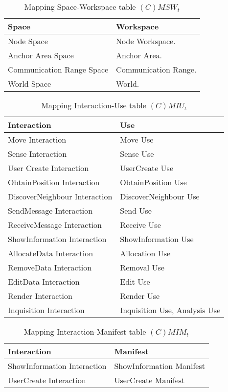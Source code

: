 \begin{table}[H]
	\centering
	\begin{tabular}{|p{4cm}|p{8cm}|}
			\hline
			\textbf{Space} & \textbf{Workspace} \\
			\hline
			Node Space & Node Workspace. \\
			\hline
			Anchor Area Space & Anchor Area. \\
			\hline
			Communication Range Space & Communication Range.\\
			\hline
			World Space & World. \\
			\hline
		\end{tabular}
	\caption{Mapping Space-Workspace table $(C)MSW_t$}
	\label{tab:cmsrt}
\end{table}

\begin{table}[H]
	\centering
	\begin{tabular}{|p{4cm}|p{8cm}|}
			\hline
			\textbf{Interaction} & \textbf{Use} \\
			\hline
			Move Interaction & Move Use \\
			\hline
			Sense Interaction & Sense Use \\
			\hline
			User Create Interaction & UserCreate Use \\
			\hline
			ObtainPosition Interaction & ObtainPosition Use \\	
			\hline
			DiscoverNeighbour Interaction & DiscoverNeighbour Use \\	
			\hline
			SendMessage Interaction & Send Use \\	
			\hline
			ReceiveMessage Interaction & Receive Use \\	
			\hline
			ShowInformation Interaction & ShowInformation Use \\
			\hline
			AllocateData Interaction & Allocation Use \\
			\hline
			RemoveData Interaction & Removal Use \\
			\hline
			EditData Interaction & Edit Use \\
			\hline
			Render Interaction & Render Use \\
			\hline
			Inquisition Interaction & Inquisition Use, Analysis Use \\
			\hline
		\end{tabular}
	\caption{Mapping Interaction-Use table $(C)MIU_t$}
	\label{tab:cmiut}
\end{table}

\begin{table}[H]
	\centering
	\begin{tabular}{|p{4cm}|p{8cm}|}
			\hline
			\textbf{Interaction} & \textbf{Manifest} \\
			\hline
			ShowInformation Interaction & ShowInformation Manifest \\
			\hline
			UserCreate Interaction & UserCreate Manifest \\
			\hline
		\end{tabular}
	\caption{Mapping Interaction-Manifest table $(C)MIM_t$}
	\label{tab:cmimt}
\end{table}

